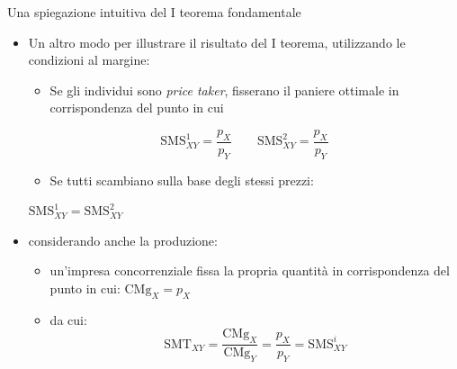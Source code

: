 \documentclass[aspectratio=64,11pt]{beamer}
\begin{document}
\begin{frame}{Una spiegazione intuitiva del I teorema fondamentale}
\begin{itemize}
\item Un altro modo per illustrare il risultato del I teorema, utilizzando le condizioni al margine:
\begin{itemize}
\item Se gli individui sono \emph{price taker}, fisserano il paniere ottimale in corrispondenza del punto in cui
\end{itemize}
\begin{equation*}
\text{SMS}^1_{XY}=\frac{p_X}{p_Y} \qquad \text{SMS}^2_{XY}=\frac{p_X}{p_Y}
\end{equation*}
\begin{itemize}
\item Se tutti scambiano sulla base degli stessi prezzi:
\end{itemize}
$\text{SMS}^1_{XY} = \text{SMS}^2_{XY}$
\item considerando anche la produzione:
\begin{itemize}
\item un’impresa concorrenziale fissa la propria quantità in corrispondenza del punto in cui:   $\text{CMg}_X=p_X$
\item da cui: $$\text{SMT}_{XY}=\frac{\text{CMg}_X}{\text{CMg}_Y}=\frac{p_X}{p_Y} = \text{SMS}^i_{XY}$$
\end{itemize}
\end{itemize}
\end{frame}
\end{document}
